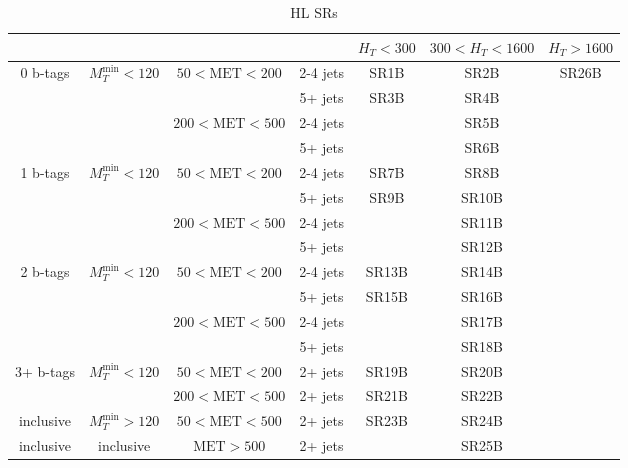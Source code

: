 \documentclass[plain,landscape]{article}
\begin{document}
\begin{table}
\renewcommand{\arraystretch}{1.3}
\centering
\begin{tabular}{|c|c|c|c|c|c|c|c|}
\hline
& & \multicolumn{2}{|c|}{ } & $H_T < 300$ & \multicolumn{2}{|c|}{$300 < H_T < 1600$} & $H_T > 1600$  \\
\hline
\multirow{4}{*}{0 b-tags} &  \multirow{4}{*}{$M_T^{\textrm{min}} < 120$} & \multirow{2}{*}{ $50 < \textrm{MET} < 200$} & 2-4 jets & SR1B & \multicolumn{2}{|c|}{SR2B} & \multirow{17}{*}{SR26B}\\
\cline{4-7}
& & & 5+ jets & \multirow{3}{*}{SR3B} & \multicolumn{2}{|c|}{SR4B} & \\
\cline{3-4} \cline{6-7}
& &  \multirow{2}{*}{$200 < \textrm{MET} < 500$} &  2-4 jets & &  \multicolumn{2}{|c|}{SR5B} & \\
\cline{4-4} \cline{6-7}
& & & 5+ jets & & \multicolumn{2}{|c|}{SR6B} &  \\
\cline{1-7}
\multirow{4}{*}{1 b-tags} & \multirow{4}{*}{$M_T^{\textrm{min}} < 120$} & \multirow{2}{*}{ $50 < \textrm{MET} < 200$} & 2-4 jets & SR7B & \multicolumn{2}{|c|}{SR8B} & \\
\cline{4-7}
& & & 5+ jets & \multirow{3}{*}{SR9B} & \multicolumn{2}{|c|}{SR10B} & \\
\cline{3-4} \cline{6-7}
& & \multirow{2}{*}{ $200 < \textrm{MET} < 500$} &  2-4 jets & &  \multicolumn{2}{|c|}{SR11B} & \\
\cline{4-4} \cline{6-7}
& & & 5+ jets & & \multicolumn{2}{|c|}{SR12B} & \\
\cline{1-7}
\multirow{4}{*}{2 b-tags} & \multirow{4}{*}{$M_T^{\textrm{min}} < 120$} & \multirow{2}{*}{ $50 < \textrm{MET} < 200$} & 2-4 jets & SR13B &  \multicolumn{2}{|c|}{SR14B}  & \\
\cline{4-7}
& & & 5+ jets & \multirow{3}{*}{SR15B} & \multicolumn{2}{|c|}{SR16B} &  \\
\cline{3-4} \cline{6-7}
& &  \multirow{2}{*}{ $200 <  \textrm{MET} < 500$} &  2-4 jets & & \multicolumn{2}{|c|}{SR17B} & \\
\cline{4-4}  \cline{6-7}
& & & 5+ jets & & \multicolumn{2}{|c|}{SR18B} & \\
\cline{1-7}
\multirow{2}{*}{3+ b-tags} & \multirow{2}{*}{$M_T^{\textrm{min}} < 120$}  & $50 < \textrm{MET} < 200$ & 2+ jets & SR19B & \multicolumn{2}{|c|}{SR20B} & \\
\cline{3-7} 
& & $200 < \textrm{MET} < 500$ & 2+ jets & SR21B & \multicolumn{2}{|c|}{SR22B} &  \\
\cline{1-7}
inclusive & $M_T^{\textrm{min}} > 120$ & $50 < \textrm{MET} < 500$  & 2+ jets & SR23B & \multicolumn{2}{|c|}{SR24B} & \\
\hline
inclusive & inclusive & $\textrm{MET} > 500$ & 2+ jets & \cellcolor{black} & \multicolumn{3}{|c|}{SR25B}  \\
\hline
\end{tabular}
\caption{HL SRs}
\end{table}
\end{document}
